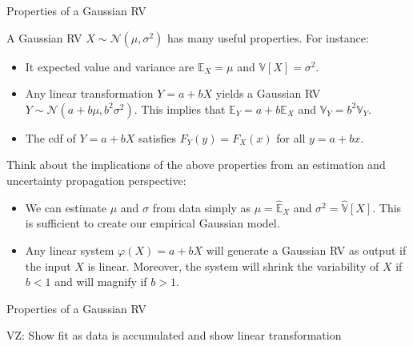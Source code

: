 \documentclass[9pt]{beamer}
\begin{document}
%
\begin{frame}{Properties of a Gaussian RV}

A Gaussian RV $X\sim \mathcal{N}(\mu,\sigma^2)$ has many useful properties. For instance:
\begin{block}{}
\begin{itemize}
\item It expected value and variance are $\mathbb{E}_X=\mu$ and $\mathbb{V}[X]=\sigma^2$. 
\item Any linear transformation $Y=a+bX$ yields a Gaussian RV $Y\sim \mathcal{N}(a+b\mu,b^2\sigma^2)$. This implies that $\mathbb{E}_Y=a+b\mathbb{E}_X$ and $\mathbb{V}_Y=b^2\mathbb{V}_Y$. 
\item The cdf of $Y=a+bX$ satisfies $F_Y(y)=F_X(x)$ for all $y=a+bx$. 
\end{itemize}
\end{block}
Think about the implications of the above properties from an estimation and uncertainty propagation perspective: 
\begin{block}{}
\begin{itemize}
\item We can estimate  $\mu$ and $\sigma$ from data simply as $\mu =\hat{\mathbb{E}}_X$ and $\sigma^2=
\hat{\mathbb{V}}[X]$. This is sufficient to create our empirical Gaussian model. 
\item Any linear system $\varphi(X)=a+bX$ will generate a Gaussian RV as output if the input $X$ is linear. Moreover, the system will shrink the variability of $X$ if $b<1$ and will magnify if $b>1$. 
\end{itemize}
\end{block}

\end{frame}

%
\begin{frame}{Properties of a Gaussian RV}
\begin{block}{}
{\color{red} VZ: Show fit as data is accumulated and show linear transformation}
\end{block}
\end{frame}
\end{document}
